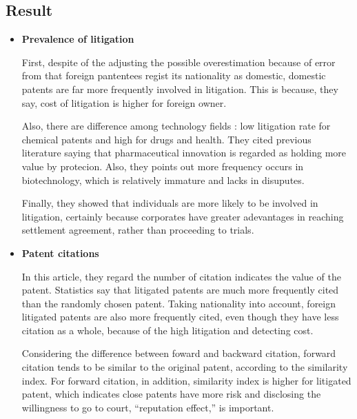 \documentclass{jsarticle}[12pt]
\begin{document}
  \subsection{Result}
  
   \begin{itemize}
   
   \item \textbf{Prevalence of litigation}
   
   \hspace{1zw}First, despite of the adjusting the possible overestimation because of error from that foreign pantentees regist its nationality as domestic, domestic patents are far more frequently involved in litigation. This is because, they say, cost of litigation is higher for foreign owner. 
   
   \hspace{1zw}Also, there are difference among technology fields : low litigation rate for chemical patents and high for drugs and health. They cited previous literature saying that pharmaceutical innovation is regarded as holding more value by protecion. Also, they points out more frequency occurs in biotechnology, which is relatively immature and lacks in disuputes.
   
   \hspace{1zw}Finally, they showed that individuals are more likely to be involved in litigation, certainly because corporates have greater adevantages in reaching settlement agreement, rather than proceeding to trials.
   
   \item \textbf{Patent citations}
   
   \hspace{1zw}In this article, they regard the number of citation indicates the value of the patent. Statistics say that litigated patents are much more frequently cited than the randomly chosen patent. Taking nationality into account, foreign litigated patents are also more frequently cited, even though they have less citation as a whole, because of the high litigation and detecting cost.
   
   \hspace{1zw}Considering the difference between foward and backward citation, forward citation tends to be similar to the original patent, according to the similarity index. For forward citation, in addition, similarity index is higher for litigated patent, which indicates close patents have more risk and disclosing the willingness to go to court, ``reputation effect,'' is important. 
   

\end{itemize}
\end{document}
